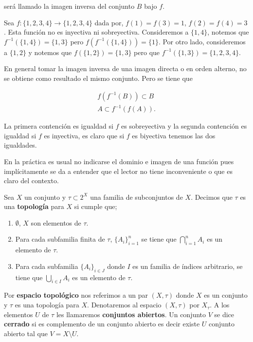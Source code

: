 será llamado la imagen inversa del conjunto $B$ bajo $f$. 

\begin{ej}
Sea $f:\{1,2,3,4\} \to \{1,2,3,4\}$ dada por, $f(1)=f(3)=1$, $f(2)=f(4)=3$. Esta función no es inyectiva ni sobreyectiva. Consideremos a $\{1,4\}$, notemos que $f^{-1}(\{1,4\})=\{1,3\}$ pero $f(f^{-1}(\{1,4\}))=\{1\}$. Por otro lado, consideremos a $\{1,2\}$ y notemos que $f(\{1,2\})=\{1,3\}$  pero que $f^{-1}(\{1,3\})=\{1,2,3,4\}$.
\end{ej}

\begin{ob}
En general tomar la imagen inversa de una imagen directa o en orden alterno, no se obtiene como resultado el mismo conjunto. Pero se tiene que
	
	\begin{align*}
	f(f^{-1}(B)) \subset B \\
	A \subset f^{-1}(f(A)) .
	\end{align*}

La primera contención es igualdad si $f$ es sobreyectiva y la segunda contención es igualdad si $f$ es inyectiva, es claro que si $f$ es biyectiva tenemos las dos igualdades. 
\end{ob}

En la práctica es usual no indicarse el dominio e imagen de una función pues implícitamente se da a entender que el lector no tiene inconveniente o que es  claro del contexto. 

\begin{df}
Sea $X$ un conjunto y $\tau \subset 2^X$ una familia de subconjuntos de $X$. Decimos que $\tau$ es una \textbf{topología} para $X$ si cumple que;

	\begin{enumerate}
		\item $\emptyset$, $X$ son elementos de  $\tau.$
		\item Para cada subfamilia finita de $\tau$, $\{A_i\}_{i=1}^n$ se tiene que $\bigcap_{i=1}^n A_i$ es un elemento de $\tau.$ 
		\item Para cada subfamilia $\{A_i\}_{i \in J}$ donde $I$ es un familia de índices arbitrario, se tiene que $\bigcup_{i \in I} A_i$ es un elemento de $\tau$.
	\end{enumerate}

Por \textbf{espacio topológico} nos referimos a un par $(X,\tau)$ donde $X$ es un conjunto y $\tau$ es una topología para $X$. Denotaremos al espacio $(X, \tau)$ por $X_{\tau}$. A los elementos $U$ de $\tau$  les llamaremos \textbf{conjuntos abiertos}. Un conjunto $V$ se dice \textbf{cerrado} si es complemento de un conjunto abierto es decir existe $U$ conjunto abierto tal que $V=X \setminus U$.  
\end{df}

